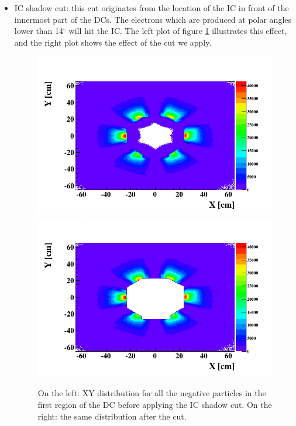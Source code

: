 \begin{itemize}
\begin{itemize}
\item IC shadow cut: this cut originates from the location of the IC in front of the innermost part of the DCs. The electrons which are produced at polar angles lower than 14$^\circ$ will hit the IC. The left plot of figure \ref{fig:IC_cut} illustrates this effect, and the right plot shows the effect of the cut we apply.
\begin{figure}[tbp]
\hspace{-0.2in}
\includegraphics[scale=0.35]{fig_analysis/el_DC_IC_XY_1.png}
\includegraphics[scale=0.35]{fig_analysis/el_DC_IC_XY_2.png}
\caption{On the left: XY distribution for all the negative particles in the first region of the DC before applying the IC shadow cut. On the right: the same distribution after the cut.} 
\label{fig:IC_cut}
\end{figure}



\end{itemize}
\end{itemize}
